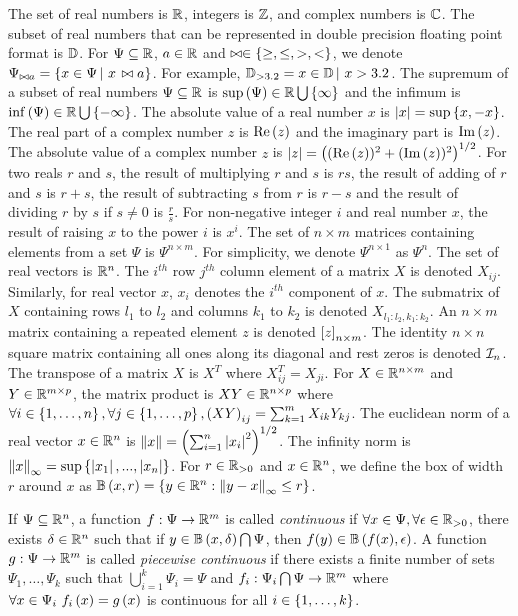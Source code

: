 The set of real numbers is $\mathbb{R}$, integers is $\mathbb{Z}$, and
complex numbers is $\mathbb{C}$.  The subset of real numbers that can be
represented in double precision floating point format is $\mathbb{D}$.
For $\Psi\subseteq\mathbb{R}$, $a\in\mathbb{R}$ and
$\bowtie\in\left\{\geq,\leq,>,<\right\}$, we denote $\Psi_{\bowtie a} = \left\{
  x\in\Psi \left|~x\right. \bowtie a \right\}$.  For example, $\mathbb{D}_{>3.2} =
{x\in\mathbb{D}\left|~x>3.2\right.}$.  The supremum of a subset of real numbers
$\Psi\subseteq\mathbb{R}$ is $\sup\left(\Psi\right)\in\mathbb{R}\bigcup\left\{\infty\right\}$
and the infimum is $\inf\left(\Psi\right)\in\mathbb{R}\bigcup\left\{-\infty\right\}$.  The
absolute value of a real number $x$ is $\left|x\right| = \sup\left\{x,-x\right\}$.
The real part of a complex number $z$ is $\operatorname{Re}\left(z\right)$ and the imaginary
part is $\operatorname{Im}\left(z\right)$.  The absolute value of a complex number $z$ is
$\left|z\right| = \left((\operatorname{Re}\left(z\right))^2 + (\operatorname{Im}\left(z\right))^2\right)^{1/2}$.  For two reals $r$
and $s$, the result of multiplying $r$ and $s$ is $rs$, the result of
adding of $r$ and $s$ is $r+s$, the result of subtracting $s$ from $r$
is $r-s$ and the result of dividing $r$ by $s$ if $s\neq 0$ is
$\frac{r}{s}$.  For non-negative integer $i$ and real number $x$, the
result of raising $x$ to the power $i$ is $x^i$.  The set of $n\times
m$ matrices containing elements from a set $\Psi$ is $\Psi^{n\times
  m}$.  For simplicity, we denote $\Psi^{n\times 1}$ as $\Psi^n$.  The
set of real vectors is $\mathbb{R}^n$.  The $i^{th}$ row $j^{th}$ column
element of a matrix $X$ is denoted $X_{ij}$.  Similarly, for real
vector $x$, $x_i$ denotes the $i^{th}$ component of $x$.  The
submatrix of $X$ containing rows $l_1$ to $l_2$ and columns $k_1$ to
$k_2$ is denoted $X_{l_1:l_2,k_1:k_2}$.  An $n\times m$ matrix
containing a repeated element $z$ is denoted $\left[z\right]_{n\times m}$.
The identity $n\times n$ square matrix containing all ones along its
diagonal and rest zeros is denoted $\mathcal{I}_{n}$.  The transpose of a
matrix $X$ is $X^T$ where $X^T_{ij} = X_{ji}$.  For
$X\in\mathbb{R}^{n\times m}$ and $Y\in\mathbb{R}^{m\times p}$, the matrix
product is $XY\in\mathbb{R}^{n\times p}$ where $\forall
i\in\left\{1,\ldots,n\right\},\forall j\in\left\{1,\ldots,p\right\},\left(XY\right)_{ij} =
\sum_{k=1}^{m}X_{ik}Y_{kj}$.  The euclidean norm of a real vector
$x\in\mathbb{R}^n$ is $\left\|x\right\| = \left(\sum_{i=1}^n\left|x_i\right|^2\right)^{1/2}$.
The infinity norm is $\left\|x\right\|_\infty =
\sup\left\{\left|x_1\right|,...,\left|x_n\right|\right\}$.  For $r\in\mathbb{R}_{> 0}$ and
$x\in\mathbb{R}^n$, we define the box of width $r$ around $x$ as
$\mathbb{B}\left(x,r\right) = \left\{ y\in\mathbb{R}^n: \left\|y - x\right\|_\infty \leq r \right\}$.

If $\Psi\subseteq\mathbb{R}^n$, a function $f:\Psi\rightarrow\mathbb{R}^m$ is
called \emph{continuous} if $\forall
x\in\Psi,\forall\epsilon\in\mathbb{R}_{>0}$, there exists
$\delta\in\mathbb{R}^n$ such that if $y\in\mathbb{B}\left(x,\delta\right)\bigcap\Psi$,
then $f(y)\in\mathbb{B}\left(f(x),\epsilon\right)$.  A function
$g:\Psi\rightarrow\mathbb{R}^m$ is called \emph{piecewise continuous} if
there exists a finite number of sets $\Psi_1,\ldots,\Psi_k$ such that
$\bigcup_{i=1}^k\Psi_i=\Psi$ and $f_i:\Psi_i\bigcap\Psi\rightarrow
\mathbb{R}^m$ where $\forall x\in\Psi_i~f_i\left(x\right)=g\left(x\right)$ is continuous
for all $i\in\left\{1,\ldots,k\right\}$.

